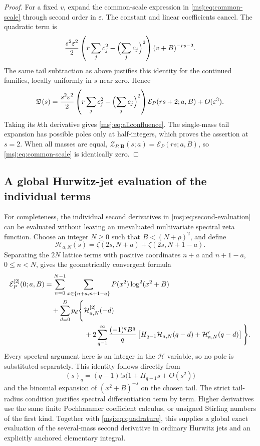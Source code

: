 \documentclass[11pt,a4paper]{article}
\numberwithin{equation}{section}
\theoremstyle{plain}
\theoremstyle{definition}
\theoremstyle{remark}
\begin{document}
\begin{proof}
For a fixed $v$, expand the common-scale expression in
\eqref{msj:eq:common-scale} through second order in $\varepsilon$.
The constant and linear coefficients cancel. The quadratic term is
\[
 \frac{s^2\varepsilon^2}{2}
 \left(r\sum_jc_j^2-\Bigl(\sum_jc_j\Bigr)^2\right)(v+B)^{-rs-2}.
\]
The same tail subtraction as above justifies this identity for the
continued families, locally uniformly in $s$ near zero. Hence
\[
 \mathfrak D(s)=\frac{s^2\varepsilon^2}{2}
 \left(r\sum_jc_j^2-\Bigl(\sum_jc_j\Bigr)^2\right)
                 \mathcal E_P(rs+2;a,B)+O(\varepsilon^3).
\]
Taking its $k$th derivative gives \eqref{msj:eq:allconfluence}.
The single-mass tail expansion has possible poles only at half-integers,
which proves the assertion at $s=2$. When all masses are equal,
$\mathcal Z_{P,\boldsymbol B}(s;a)=\mathcal E_P(rs;a,B)$, so
\eqref{msj:eq:common-scale} is identically zero.
\end{proof}

\subsection{A global Hurwitz-jet evaluation of the individual terms}

For completeness, the individual second derivatives in
\eqref{msj:eq:second-evaluation} can be evaluated without leaving an
unevaluated multivariate spectral zeta function. Choose an integer
$N\ge0$ such that $B<(N+\rho)^2$, and define
\[
 \mathcal H_{a,N}(s)=\zeta(2s,N+a)+\zeta(2s,N+1-a).
\]
Separating the $2N$ lattice terms with positive coordinates
$n+a$ and $n+1-a$, $0\le n<N$, gives the geometrically convergent
formula
\begin{align}
 \mathcal E_P^{[2]}(0;a,B)
 &=\sum_{n=0}^{N-1}\sum_{x\in\{n+a,n+1-a\}}
                         P(x^2)\log^2(x^2+B)
 \notag\\
 &\quad+\sum_{d=0}^{D}p_d\Bigg\{
    \mathcal H_{a,N}^{[2]}(-d)
 \notag\\
 &\hspace{20mm}+2\sum_{q=1}^{\infty}\frac{(-1)^qB^q}{q}
       \left[H_{q-1}\mathcal H_{a,N}(q-d)
                         +\mathcal H_{a,N}'(q-d)\right]\Bigg\}.
 \label{msj:eq:individual-second}
\end{align}
Every spectral argument here is an integer in the $\mathcal H$ variable,
so no pole is substituted separately. This identity follows directly
from
\[
 (s)_q=(q-1)!s\bigl(1+H_{q-1}s+O(s^2)\bigr)
\]
and the binomial expansion of $(x^2+B)^{-s}$ on the chosen tail.
The strict tail-radius condition justifies spectral differentiation
term by term. Higher derivatives use the same finite Pochhammer
coefficient calculus, or unsigned Stirling numbers of the first kind.
Together with \eqref{msj:eq:quadrature}, this supplies a global exact
evaluation of the several-mass second derivative in ordinary Hurwitz
jets and an explicitly anchored elementary integral.
\end{document}
